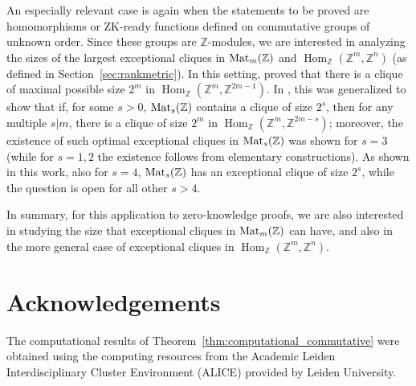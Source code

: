 \documentclass{amsart}
\theoremstyle{plain}
\theoremstyle{definition}
\DeclareMathOperator{\Hom}{Hom}
\newcommand{\Z}{\ensuremath{\mathbb{Z}}}
\begin{document}
An especially relevant case is again when the statements to be proved are homomorphisms or ZK-ready functions defined on commutative groups of unknown order. Since these groups are $\Z$-modules, we are interested in analyzing the sizes of the largest exceptional cliques in $\textup{Mat}_m(\Z)$ and $\Hom_\Z(\Z^m,\Z^n)$ (as defined in Section~\ref{sec:rankmetric}). In this setting, \cite{CD09} proved that there is a clique of maximal possible size $2^m$ in $\Hom_\Z(\Z^m,\Z^{2m-1})$. In \cite{BC24}, this was generalized to show that if, for some $s>0$, $\textup{Mat}_s(\Z)$ contains a clique of size $2^s$, then for any multiple $s|m$, there is a clique of size $2^m$ in $\Hom_\Z(\Z^m,\Z^{2m-s})$; moreover, the existence of such optimal exceptional cliques in $\textup{Mat}_s(\Z)$ was shown for $s=3$ (while for $s=1,2$ the existence follows from elementary constructions). As shown in this work, also for $s=4$, $\textup{Mat}_s(\Z)$ has an exceptional clique of size $2^s$, while the question is open for all other $s>4$.

In summary, for this application to zero-knowledge proofs, we are also interested in studying the size that exceptional cliques in $\textup{Mat}_m(\Z)$ can have, and also in the more general case of exceptional cliques in $\Hom_\Z(\Z^m,\Z^n)$.


 

 


\section*{Acknowledgements}

The computational results of Theorem~\ref{thm:computational_commutative} were obtained using the computing resources from the Academic Leiden Interdisciplinary Cluster Environment (ALICE) provided by Leiden University.

 

\end{document}
